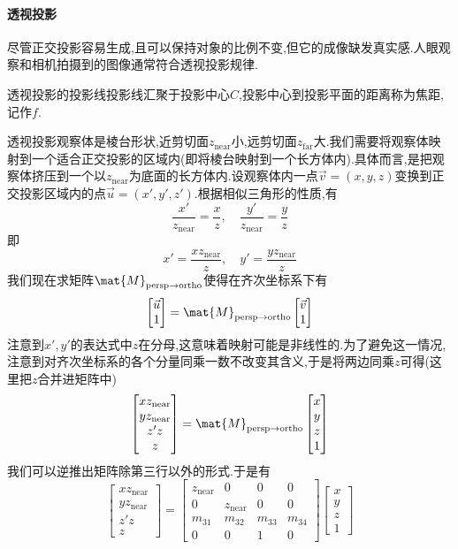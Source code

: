 \documentclass{ctexart}
\begin{document}
\paragraph{透视投影}
尽管正交投影容易生成,且可以保持对象的比例不变,但它的成像缺发真实感.人眼观察和相机拍摄到的图像通常符合透视投影规律.
\begin{definition}[透视投影]
    透视投影的投影线投影线汇聚于投影中心$C$,投影中心到投影平面的距离称为焦距,记作$f$.
\end{definition}
\indent 透视投影观察体是棱台形状,近剪切面$z_{\text{near}}$小,远剪切面$z_{\text{far}}$大.我们需要将观察体映射到一个适合正交投影的区域内(即将棱台映射到一个长方体内).具体而言,是把观察体挤压到一个以$z_{\text{near}}$为底面的长方体内.设观察体内一点$\vec{v}=(x,y,z)$变换到正交投影区域内的点$\vec{u}=\left(x',y',z'\right)$.根据相似三角形的性质,有
\[\dfrac{x'}{z_{\text{near}}}=\dfrac{x}{z},\quad\dfrac{y'}{z_{\text{near}}}=\dfrac{y}{z}\]
即
\[x'=\dfrac{xz_{\text{near}}}{z},\quad y'=\dfrac{yz_{\text{near}}}{z}\]
我们现在求矩阵$\mat{M}_{\text{persp}\to\text{ortho}}$使得在齐次坐标系下有
\[\begin{bmatrix}
    \vec{u}\\1
\end{bmatrix}=\mat{M}_{\text{persp}\to\text{ortho}}\begin{bmatrix}
    \vec{v}\\1
\end{bmatrix}\]
注意到$x',y'$的表达式中$z$在分母,这意味着映射可能是非线性的.为了避免这一情况,注意到对齐次坐标系的各个分量同乘一数不改变其含义,于是将两边同乘$z$可得(这里把$z$合并进矩阵中)
\[\begin{bmatrix}
    xz_{\text{near}}\\yz_{\text{near}}\\z'z\\z
\end{bmatrix}=\mat{M}_{\text{persp}\to\text{ortho}}\begin{bmatrix}
    x\\y\\z\\1
\end{bmatrix}\]
我们可以逆推出矩阵除第三行以外的形式.于是有
\[\begin{bmatrix}
    xz_{\text{near}}\\yz_{\text{near}}\\z'z\\z
\end{bmatrix}=\begin{bmatrix}
    z_{\text{near}}&0&0&0\\
    0&z_{\text{near}}&0&0\\
    m_{31}&m_{32}&m_{33}&m_{34}\\
    0&0&1&0
\end{bmatrix}\begin{bmatrix}
    x\\y\\z\\1
\end{bmatrix}\]
\end{document}
